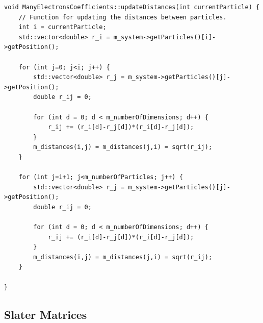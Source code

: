 \documentclass[../main.tex]{subfiles}
\begin{document}
\lstset{language=c++}
\begin{lstlisting}[caption={Function for updating the relative distances between particles whenever a particle is moved. $i$ is the moved particle so only the matrix elements where one of the indices is $i$ are changed when particle $i$ moves. Since no particle has any distance to itself, we split the loop in two so that we can exclude the $j=i$ case without using an if-test. Since the matrix is symmetric, $r_{ij} = r_{ji}$, and thus we can halve the number of distance calculations.}]
void ManyElectronsCoefficients::updateDistances(int currentParticle) {
    // Function for updating the distances between particles.
    int i = currentParticle;
    std::vector<double> r_i = m_system->getParticles()[i]->getPosition();

    for (int j=0; j<i; j++) {
        std::vector<double> r_j = m_system->getParticles()[j]->getPosition();
        double r_ij = 0;

        for (int d = 0; d < m_numberOfDimensions; d++) {
            r_ij += (r_i[d]-r_j[d])*(r_i[d]-r_j[d]);
        }
        m_distances(i,j) = m_distances(j,i) = sqrt(r_ij);
    }

    for (int j=i+1; j<m_numberOfParticles; j++) {
        std::vector<double> r_j = m_system->getParticles()[j]->getPosition();
        double r_ij = 0;

        for (int d = 0; d < m_numberOfDimensions; d++) {
            r_ij += (r_i[d]-r_j[d])*(r_i[d]-r_j[d]);
        }
        m_distances(i,j) = m_distances(j,i) = sqrt(r_ij);
    }
    
}
\end{lstlisting}

\subsection{Slater Matrices}
\end{document}
